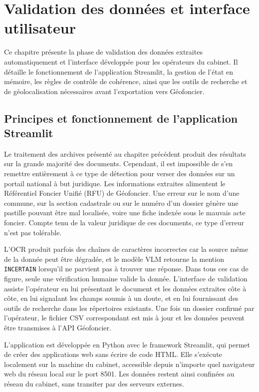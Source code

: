 
\section{Validation des données et interface utilisateur}
\label{sec:fiabilisation}

Ce chapitre présente la phase de validation des données extraites automatiquement et l'interface développée pour les opérateurs du cabinet. Il détaille le fonctionnement de l'application Streamlit, la gestion de l'état en mémoire, les règles de contrôle de cohérence, ainsi que les outils de recherche et de géolocalisation nécessaires avant l'exportation vers Géofoncier.


\subsection{Principes et fonctionnement de l'application Streamlit}

Le traitement des archives présenté au chapitre précédent produit des résultats sur la grande majorité des documents. Cependant, il est impossible de s'en remettre entièrement à ce type de détection pour verser des données sur un portail national à but juridique. Les informations extraites alimentent le Référentiel Foncier Unifié (RFU) de Géofoncier. Une erreur sur le nom d'une commune, sur la section cadastrale ou sur le numéro d'un dossier génère une pastille pouvant être mal localisée, voire une fiche indexée sous le mauvais acte foncier. Compte tenu de la valeur juridique de ces documents, ce type d'erreur n'est pas tolérable.

L'OCR produit parfois des chaînes de caractères incorrectes car la source même de la donnée peut être dégradée, et le modèle VLM retourne la mention \texttt{INCERTAIN} lorsqu'il ne parvient pas à trouver une réponse. Dans tous ces cas de figure, seule une vérification humaine valide la donnée. L'interface de validation assiste l'opérateur en lui présentant le document et les données extraites côte à côte, en lui signalant les champs soumis à un doute, et en lui fournissant des outils de recherche dans les répertoires existants. Une fois un dossier confirmé par l'opérateur, le fichier CSV correspondant est mis à jour et les données peuvent être transmises à l'API Géofoncier.

L'application est développée en Python avec le framework Streamlit, qui permet de créer des applications web sans écrire de code HTML. Elle s'exécute localement sur la machine du cabinet, accessible depuis n'importe quel navigateur web du réseau local sur le port 8501. Les données restent ainsi confinées au réseau du cabinet, sans transiter par des serveurs externes.

